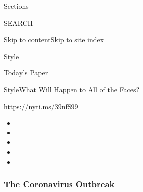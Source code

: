 Sections

SEARCH

\protect\hyperlink{site-content}{Skip to
content}\protect\hyperlink{site-index}{Skip to site index}

\href{https://www.nytimes3xbfgragh.onion/section/style}{Style}

\href{https://myaccount.nytimes3xbfgragh.onion/auth/login?response_type=cookie\&client_id=vi}{}

\href{https://www.nytimes3xbfgragh.onion/section/todayspaper}{Today's
Paper}

\href{/section/style}{Style}\textbar{}What Will Happen to All of the
Faces?

\url{https://nyti.ms/39nfS99}

\begin{itemize}
\item
\item
\item
\item
\item
\end{itemize}

\hypertarget{the-coronavirus-outbreak}{%
\subsubsection{\texorpdfstring{\href{https://www.nytimes3xbfgragh.onion/news-event/coronavirus?name=styln-coronavirus-national\&region=TOP_BANNER\&block=storyline_menu_recirc\&action=click\&pgtype=Article\&impression_id=e0e1ede0-f280-11ea-b468-27530939d74e\&variant=undefined}{The
Coronavirus
Outbreak}}{The Coronavirus Outbreak}}\label{the-coronavirus-outbreak}}

